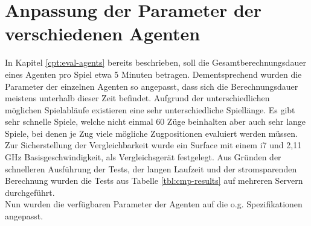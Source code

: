 \section{Anpassung der Parameter der verschiedenen Agenten}
In Kapitel \ref{cpt:eval-agents} bereits beschrieben, soll die Gesamtberechnungsdauer eines Agenten pro Spiel etwa 5 Minuten betragen. Dementsprechend wurden die Parameter der einzelnen Agenten so angepasst, dass sich die Berechnungsdauer meistens unterhalb dieser Zeit befindet. Aufgrund der unterschiedlichen möglichen Spielabläufe existieren eine sehr unterschiedliche Spiellänge. Es gibt sehr schnelle Spiele, welche nicht einmal 60 Züge beinhalten aber auch sehr lange Spiele, bei denen je Zug viele mögliche Zugpositionen evaluiert werden müssen. Zur Sicherstellung der Vergleichbarkeit wurde ein Surface mit einem i7 und 2,11 GHz Basisgeschwindigkeit, als Vergleichsgerät festgelegt. Aus Gründen der schnelleren Ausführung der Tests, der langen Laufzeit und der stromsparenden Berechnung wurden die Tests aus Tabelle \ref{tbl:cmp-results} auf mehreren Servern durchgeführt.
\\Nun wurden die verfügbaren Parameter der Agenten auf die o.g. Spezifikationen angepasst.
